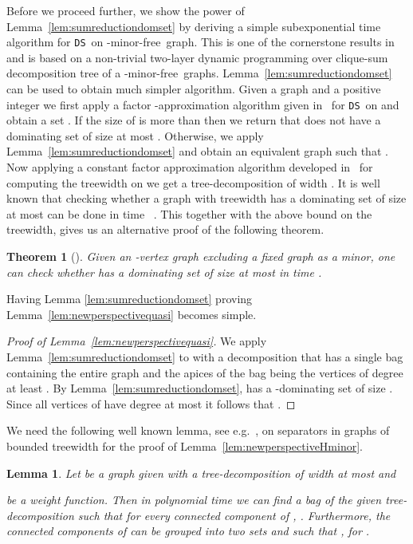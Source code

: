 \documentclass[11pt]{article}
\newtheorem{theorem}{Theorem}
\newtheorem{lemma}{Lemma}
\newcommand{\Hmf}{-minor-free}
\newcommand{\tDS}{{\texttt{\sc DS}}}
\begin{document}
Before we proceed further, we show the power of Lemma~\ref{lem:sumreductiondomset} by deriving a simple subexponential time algorithm for \tDS \, on \Hmf \, graph. This is one of the cornerstone results in~\cite{DemaineFHT05sub} and is based on a non-trivial two-layer dynamic programming over clique-sum decomposition tree of a \Hmf \, graphs. 
Lemma~\ref{lem:sumreductiondomset} can be used to obtain much simpler algorithm. Given a graph  and a positive integer  we first apply a factor -approximation algorithm given in~\cite{DemaineHaj05,FominLRS10} for \tDS \, on  and obtain a set . If the size of  is more than  then we return that  does not have a dominating set of size at most . Otherwise,  we apply Lemma~\ref{lem:sumreductiondomset} and obtain an equivalent graph  such that . Now applying a constant factor approximation algorithm developed in~\cite{DemaineFHT05sub} for computing the treewidth on  we get a tree-decomposition of width  . It is well known that checking whether a graph with treewidth  has a dominating set of size at most  can be done in time  ~\cite{RooijBR09}. This together with the above bound on the treewidth, gives us an alternative proof of the following theorem.
\begin{theorem}[\cite{DemaineHaj05}]\label{THM:Demaine}
Given an -vertex  graph  excluding a fixed graph  as a minor, one can check whether  has a dominating set of size at most  in time . 
\end{theorem}



Having Lemma \ref{lem:sumreductiondomset} proving Lemma~\ref{lem:newperspectivequasi} becomes simple.

\begin{proof}[Proof of Lemma~\ref{lem:newperspectivequasi}]
We apply Lemma~\ref{lem:sumreductiondomset} to  with a decomposition that has a single bag containing the entire graph and the apices  of the bag being the vertices of degree at least . By Lemma~\ref{lem:sumreductiondomset},  has a -dominating set of size . Since all vertices of  have degree at most  it follows that . 
\end{proof}

We need the following well known lemma, see e.g.\ \cite{Bodlaender98}, on separators in graphs of bounded treewidth for the proof of Lemma~\ref{lem:newperspectiveHminor}. 
\begin{lemma}
\label{lemma:balsep1}
Let  be a graph given with a tree-decomposition of width at most  and 
 
be a weight function. 
Then  in polynomial time we can find a bag  of the given tree-decomposition 
such that for every connected component  of , . Furthermore, 
the connected components  of  can be grouped into two sets 
 and  such that 
, for . \end{lemma}
\end{document}
